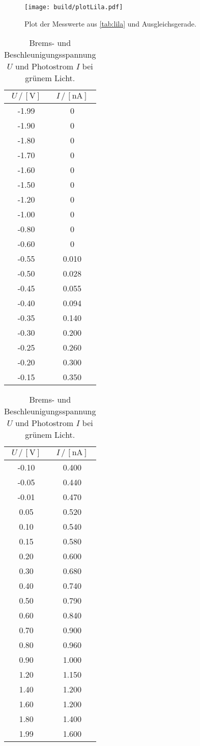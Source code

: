 \begin{figure}
  \centering
  \texttt{[image: build/plotLila.pdf]}
  \caption{Plot der Messwerte aus \autoref{tab:lila} und Ausgleichsgerade.}
  \label{fig:plot_lila}
\end{figure}

\begin{table}[H]
  \centering
  \caption{Brems- und Beschleunigungsspannung $U$ und Photostrom $I$ bei grünem Licht.}
  \begin{tabular}{|c|c|}
    \toprule
    $U \,/\, [\si{\volt}]$ & $I \,/\, [\si{\nano\ampere}]$\\
    \midrule
    -1.99 & 0\\
    -1.90 & 0\\
    -1.80 & 0\\
    -1.70 & 0\\
    -1.60 & 0\\
    -1.50 & 0\\
    -1.20 & 0\\
    -1.00 & 0\\
    -0.80 & 0\\
    -0.60 & 0\\
    -0.55 & 0.010\\
    -0.50 & 0.028\\
    -0.45 & 0.055\\
    -0.40 & 0.094\\
    -0.35 & 0.140\\
    -0.30 & 0.200\\
    -0.25 & 0.260\\
    -0.20 & 0.300\\
    -0.15 & 0.350\\
    \bottomrule
  \end{tabular}
  \begin{tabular}{|c|c|}
    \toprule
    $U \,/\, [\si{\volt}]$ & $I \,/\, [\si{\nano\ampere}]$\\
    \midrule
    -0.10 & 0.400\\
    -0.05 & 0.440\\
    -0.01 & 0.470\\
    0.05 & 0.520\\
    0.10 & 0.540\\
    0.15 & 0.580\\
    0.20 & 0.600\\
    0.30 & 0.680\\
    0.40 & 0.740\\
    0.50 & 0.790\\
    0.60 & 0.840\\
    0.70 & 0.900\\
    0.80 & 0.960\\
    0.90 & 1.000\\
    1.20 & 1.150\\
    1.40 & 1.200\\
    1.60 & 1.200\\
    1.80 & 1.400\\
    1.99 & 1.600\\
    \bottomrule
  \end{tabular}
  \label{tab:gruen}
\end{table}

